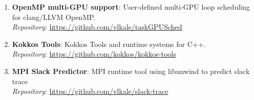 \begin{enumerate}
\item \textbf{OpenMP multi-GPU support}: User-defined multi-GPU loop scheduling for clang/LLVM OpenMP. \\ \textit{Repository}: \url{https://github.com/vlkale/taskGPUSched}
\item \textbf{Kokkos Tools}: Kokkos Tools and runtime systems for C++.\\ \textit{Repository}: \url{https://github.com/kokkos/kokkos-tools}
\item \textbf{MPI Slack Predictor}: MPI runtime tool using libunwind to predict slack trace \\ \textit{Repository}: \url{https://github.com/vlkale/slack-trace}
\end{enumerate}
